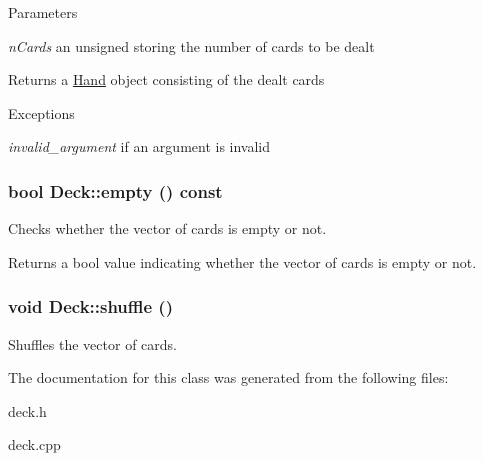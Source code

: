 \begin{DoxyParams}{Parameters}
\item[{\em nCards}]an unsigned storing the number of cards to be dealt \end{DoxyParams}
\begin{DoxyReturn}{Returns}
a \hyperlink{classHand}{Hand} object consisting of the dealt cards 
\end{DoxyReturn}

\begin{DoxyExceptions}{Exceptions}
\item[{\em invalid\_\-argument}]if an argument is invalid \end{DoxyExceptions}
\hypertarget{classDeck_aff5fe74415782b0604d5a9f568acb2f7}{
\subsubsection[{empty}]{\setlength{\rightskip}{0pt plus 5cm}bool Deck::empty () const}}
\label{classDeck_aff5fe74415782b0604d5a9f568acb2f7}
Checks whether the vector of cards is empty or not.

\begin{DoxyReturn}{Returns}
a bool value indicating whether the vector of cards is empty or not. 
\end{DoxyReturn}
\hypertarget{classDeck_ae5a1e52ab00ae5924f2bc6b730dba3eb}{
\subsubsection[{shuffle}]{\setlength{\rightskip}{0pt plus 5cm}void Deck::shuffle ()}}
\label{classDeck_ae5a1e52ab00ae5924f2bc6b730dba3eb}
Shuffles the vector of cards. 

The documentation for this class was generated from the following files:\begin{DoxyCompactItemize}
\item 
deck.h\item 
deck.cpp\end{DoxyCompactItemize}
